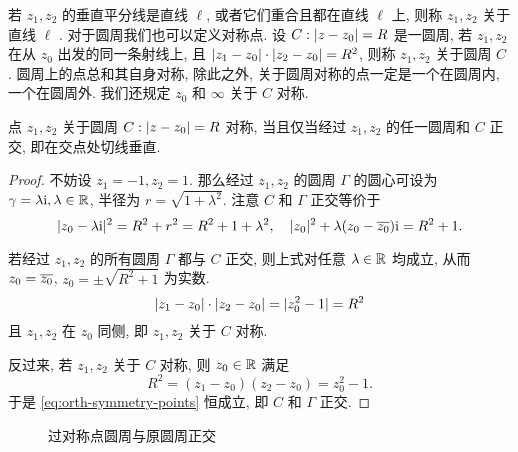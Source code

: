 若 $z_1,z_2$ 的垂直平分线是直线 $\ell$, 或者它们重合且都在直线 $\ell$ 上, 则称 $z_1,z_2$ 关于直线 $\ell$ .
对于圆周我们也可以定义对称点.
设 $C:\lvert z-z_0\rvert=R$ 是一圆周, 若 $z_1,z_2$ 在从 $z_0$ 出发的同一条射线上, 且 $\lvert z_1-z_0\rvert\cdot\lvert z_2-z_0\rvert=R^2$, 则称 $z_1,z_2$ 关于圆周 $C$ .
圆周上的点总和其自身对称, 除此之外, 关于圆周对称的点一定是一个在圆周内, 一个在圆周外.
我们还规定 $z_0$ 和 $\infty$ 关于 $C$ 对称.

\begin{lemma}
  \label{lem:symmetry-circle}
  点 $z_1,z_2$ 关于圆周 $C:\lvert z-z_0\rvert=R$ 对称, 当且仅当经过 $z_1,z_2$ 的任一圆周和 $C$ 正交, 即在交点处切线垂直.
\end{lemma}

\begin{proof}
  不妨设 $z_1=-1,z_2=1$.
  那么经过 $z_1,z_2$ 的圆周 $\Gamma$ 的圆心可设为 $\gamma=\lambda\mathrm{i},\lambda\in{\mathbb{R}}$, 半径为 $r=\sqrt{1+\lambda^2}$.
  注意 $C$ 和 $\Gamma$ 正交等价于
  \begin{equation}
    \label{eq:orth-symmetry-points}
     \lvert z_0-\lambda\mathrm{i}\rvert^2
    =R^2+r^2
    =R^2+1+\lambda^2,\quad
     \lvert z_0\rvert^2+\lambda(z_0-\overline{z_0})\mathrm{i}
    =R^2+1.
  \end{equation}

  若经过 $z_1,z_2$ 的所有圆周 $\Gamma$ 都与 $C$ 正交, 则上式对任意 $\lambda\in{\mathbb{R}}$ 均成立, 从而 $z_0=\overline{z_0}$, $z_0=\pm\sqrt{R^2+1}$ 为实数.
  \[
    \lvert z_1-z_0\rvert\cdot\lvert z_2-z_0\rvert=\lvert z_0^2-1\rvert=R^2
  \]
  且 $z_1,z_2$ 在 $z_0$ 同侧, 即 $z_1,z_2$ 关于 $C$ 对称.

  反过来, 若 $z_1,z_2$ 关于 $C$ 对称, 则 $z_0\in{\mathbb{R}}$ 满足
  \[
    R^2=(z_1-z_0)(z_2-z_0)=z_0^2-1.
  \]
  于是 \ref{eq:orth-symmetry-points} 恒成立, 即 $C$ 和 $\Gamma$ 正交.
\end{proof}

\begin{figure}[H]
  \centering
  \caption{过对称点圆周与原圆周正交}
\end{figure}

